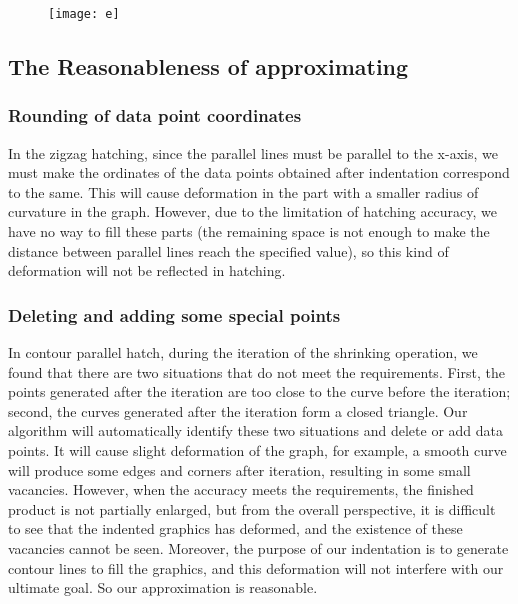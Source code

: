 \documentclass{apmcmthesis}
\begin{document}
\begin{figure}[!ht]
  \centering
  \texttt{[image: e]}
  \caption{}
\end{figure}


\subsection{The Reasonableness of approximating}


\subsubsection{Rounding of data point coordinates}
In the zigzag hatching, since the parallel lines must be parallel to the x-axis, we must make the ordinates of the data points obtained after indentation correspond to the same. This will cause deformation in the part with a smaller radius of curvature in the graph. However, due to the limitation of hatching accuracy, we have no way to fill these parts (the remaining space is not enough to make the distance between parallel lines reach the specified value), so this kind of deformation will not be reflected in hatching.

\subsubsection{Deleting and adding some special points}
In contour parallel hatch, during the iteration of the shrinking operation, we found that there are two situations that do not meet the requirements. First, the points generated after the iteration are too close to the curve before the iteration; second, the curves generated after the iteration form a closed triangle. Our algorithm will automatically identify these two situations and delete or add data points. It will cause slight deformation of the graph, for example, a smooth curve will produce some edges and corners after iteration, resulting in some small vacancies. However, when the accuracy meets the requirements, the finished product is not partially enlarged, but from the overall perspective, it is difficult to see that the indented graphics has deformed, and the existence of these vacancies cannot be seen. Moreover, the purpose of our indentation is to generate contour lines to fill the graphics, and this deformation will not interfere with our ultimate goal. So our approximation is reasonable.
\end{document}
